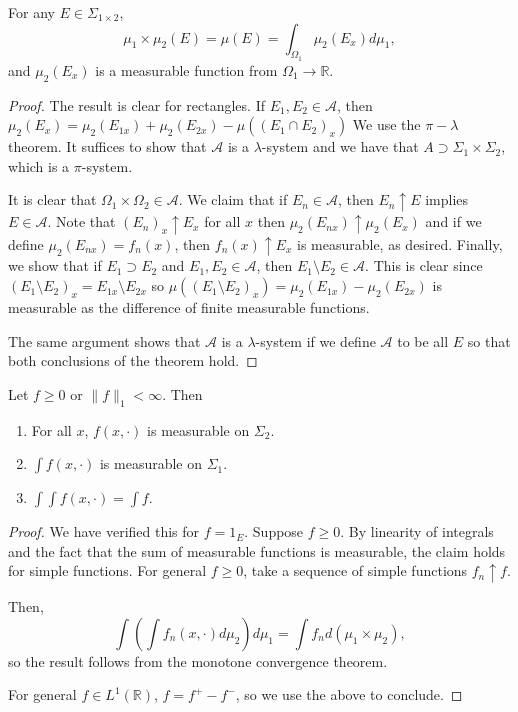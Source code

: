 \documentclass[11pt]{scrartcl}
\newcommand{\R}{\mathbb{R}}
\begin{document}
\begin{thm} For any $E \in \Sigma_{1 \times 2}$, 
$$\mu_1 \times \mu_2(E) = \mu(E) = \int_{\Omega_1} \mu_2(E_x)d\mu_1,$$
and $\mu_2(E_x)$ is a measurable function from $\Omega_1 \rightarrow \R$.
\end{thm}
\begin{proof}
The result is clear for rectangles.  If $E_1, E_2 \in \mathcal{A}$, then $\mu_2(E_x) = \mu_2(E_{1x}) + \mu_2( E_{2x}) - \mu((E_{1} \cap E_{2})_x)$  We use the $\pi-\lambda$ theorem.  It suffices to show that $\mathcal A$ is a $\lambda$-system and we have that $A \supset \Sigma_1 \times \Sigma_2$, which is a $\pi
$-system.

It is clear that $\Omega_1 \times \Omega_2 \in \mathcal A$.  We claim that if $E_n \in \mathcal A$, then $E_n \uparrow E$ implies $E \in \mathcal A$.  
Note that $(E_n)_x \uparrow E_x$ for all $x$ then $\mu_2(E_{nx}) \uparrow \mu_2(E_x)$ and if we define $\mu_2(E_{nx}) = f_n(x)$, then $f_n(x) \uparrow E_x$ is measurable, as desired.  
Finally, we show that if $E_1 \supset E_2$ and $E_1, E_2 \in \mathcal A$, then $E_1 \setminus E_2 \in \mathcal A$.  This is clear since $(E_1 \setminus E_2)_x = E_{1x} \setminus E_{2x}$ so $\mu((E_1 \setminus E_2)_x) = \mu_2(E_{1x}) - \mu_2(E_{2x})$ is measurable as the difference of finite measurable functions.

The same argument shows that $\mathcal A$ is a $\lambda$-system if we define $\mathcal A$ to be all $E$ so that both conclusions of the theorem hold. 

\end{proof}
\begin{thm}[Fubini] Let $f \ge 0$ or $\|f\|_1 < \infty$.  Then 
\begin{enumerate}
\item For all $x$, $f(x, \cdot)$ is measurable on $\Sigma_2$.
\item $\int f(x, \cdot)$ is measurable on $\Sigma_1$.
\item $\int \int f(x, \cdot) = \int f$.
\end{enumerate}
\end{thm}
\begin{proof}
We have verified this for $f = 1_E$.  Suppose $f \ge 0$.  By linearity of integrals and the fact that the sum of measurable functions is measurable, the claim holds for simple functions.  For general $f \ge 0$, take a sequence of simple functions $f_n \uparrow f$.  

Then,
$$\int \left( \int f_n(x, \cdot) d\mu_2 \right )d\mu_1 = \int f_n d(\mu_1\times \mu_2),$$
so the result follows from the monotone convergence theorem.

For general $f \in L^1(\R)$, $f = f^+ - f^-$, so we use the above to conclude.
\end{proof}
\end{document}
